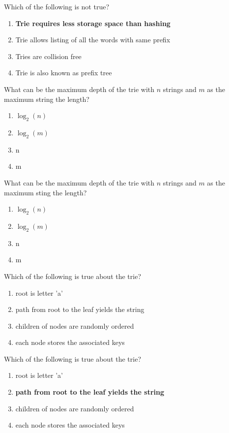 \begin{frame}{Which of the following is not true?}
     \begin{enumerate}[label=\alph*.]
        \item \textbf{Trie requires less storage space than hashing}
        \item Trie allows listing of all the words with same prefix
        \item Tries are collision free
        \item Trie is also known as prefix tree
     \end{enumerate}
\end{frame}
\begin{frame}{What can be the maximum depth of the trie with $n$ strings and $m$ as the maximum string the length?}
    \begin{enumerate}[label=\alph*.]
    \item $\log_2(n)$ 
    \item $\log_2(m)$
    \item n
    \item m
    \end{enumerate}
\end{frame}
\begin{frame}{What can be the maximum depth of the trie with $n$ strings and $m$ as the maximum sting the length?}
    \begin{enumerate}[label=\alph*.]
    \item $\log_2(n)$ 
    \item $\log_2(m)$
    \item n
    \item m
    \end{enumerate}
\end{frame}
\begin{frame}{Which of the following is true about the trie?}
    \begin{enumerate}[label=\alph*.]
    \item root is letter 'a'
    \item path from root to the leaf yields the string
    \item children of nodes are randomly ordered
    \item each node stores the associated keys
    \end{enumerate}
\end{frame}
\begin{frame}{Which of the following is true about the trie?}
    \begin{enumerate}[label=\alph*.]
    \item root is letter 'a'
    \item \textbf{path from root to the leaf yields the string}
    \item children of nodes are randomly ordered
    \item each node stores the associated keys
    \end{enumerate}
\end{frame}
